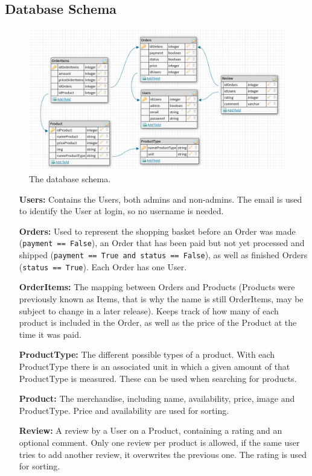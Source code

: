 \newpage

\subsection{Database Schema}

\begin{figure}[H]
  \centering
  \includegraphics[width=\textwidth]{third_sprint/db_schema.png}
  \caption{\label{fig:schema} The database schema.}
\end{figure}

\begin{itemize}
  \item[\textbf{Users:}] Contains the Users, both admins and non-admins. The
    email is used to identify the User at login, so no username is needed.
  \item[\textbf{Orders:}] Used to represent the shopping basket before an
    Order was made (\texttt{payment == False}), an Order that has
    been paid but not yet processed and shipped (\texttt{payment
    == True and status == False}), as well as finished Orders
    (\texttt{status == True}). Each Order has one User.
  \item[\textbf{OrderItems:}] The mapping between Orders and Products
    (Products were previously known as Items, that is why the name is still
    OrderItems, may be subject to change in a later release). Keeps track
    of how many of each product is included in the Order, as well as the
    price of the Product at the time it was paid.
  \item[\textbf{ProductType:}] The different possible types of a product. With
    each ProductType there is an associated unit in which a given amount
    of that ProductType is measured. These can be used when searching for
    products.
  \item[\textbf{Product:}] The merchandise, including name, availability,
  price, image and ProductType. Price and availability are used for sorting.
  \item[\textbf{Review:}] A review by a User on a Product, containing a rating
    and an optional comment. Only one review per product is allowed, if the
    same user tries to add another review, it overwrites the previous one. The
    rating is used for sorting.
\end{itemize}

